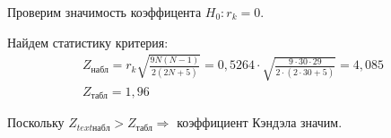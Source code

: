 \documentclass[utf8, a4paper, 14pt, russian, oneside]{book}
\begin{document}
Проверим значимость коэффицента $H_0: r_k = 0$.

Найдем статистику критерия:
\begin{gather*}
    Z_{\text{набл}} = r_k \sqrt{
        \frac{
            9N(N-1)
        }{
            2(2N+5)
        }
    } = 
    0,5264 \cdot \sqrt{
        \frac{
            9\cdot 30 \cdot 29
        }{
            2 \cdot(2 \cdot 30 + 5)
        }
    } = 4,085\\
    Z_{\text{табл}} = 1,96
\end{gather*}

Поскольку $Z_{text{набл}} > Z_{\text{табл}} \Rightarrow$ коэффициент Кэндэла значим.

\newpage
{}
\end{document}
